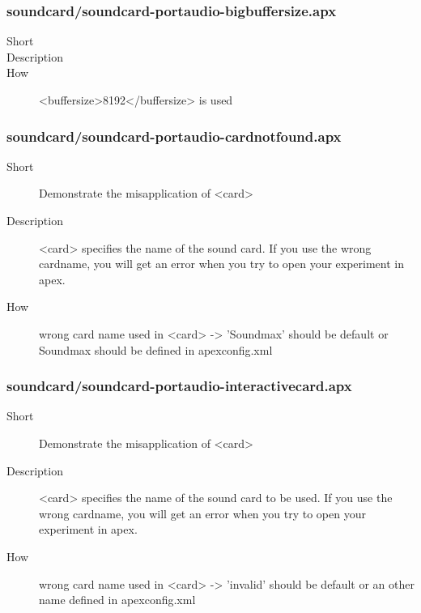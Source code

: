 \subsubsection{soundcard/soundcard-portaudio-bigbuffersize.apx}
\begin{description}
\item[Short] 

\item[Description] 

\item[How] 
 \textless{}buffersize\textgreater{}8192\textless{}/buffersize\textgreater{} is used
\end{description}

\subsubsection{soundcard/soundcard-portaudio-cardnotfound.apx}
\begin{description}
\item[Short] 
 Demonstrate the misapplication of \textless{}card\textgreater{}
\item[Description] 
 \textless{}card\textgreater{} specifies the name of the sound card. If you use the wrong cardname, you will get an error when you try to open your experiment in apex.
\item[How] 
 wrong card name used in \textless{}card\textgreater{} -\textgreater{} 'Soundmax' should be default or Soundmax should be defined in apexconfig.xml
\end{description}

\subsubsection{soundcard/soundcard-portaudio-interactivecard.apx}
\begin{description}
\item[Short] 
 Demonstrate the misapplication of \textless{}card\textgreater{}
\item[Description] 
 \textless{}card\textgreater{} specifies the name of the sound card to be used. If you use the wrong cardname, you will get an error when you try to open your experiment in apex.
\item[How] 
 wrong card name used in \textless{}card\textgreater{} -\textgreater{} 'invalid' should be default or an other name defined in apexconfig.xml
\end{description}

